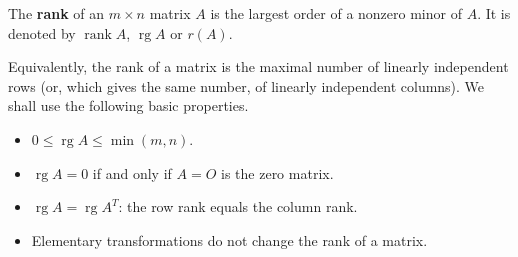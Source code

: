 \begin{tarif}
The \textbf{rank} of an $m\times n$ matrix $A$ is the largest order of a
nonzero minor of $A$. It is denoted by $\operatorname{rank}A$,
$\operatorname{rg}A$ or $r(A)$.
\end{tarif}
Equivalently, the rank of a matrix is the maximal number of linearly
independent rows (or, which gives the same number, of linearly independent
columns). We shall use the following basic properties.
\begin{itemize}[leftmargin=1.3em]
\item $0 \leq \operatorname{rg}A \leq \min(m,n)$.
\item $\operatorname{rg}A = 0$ if and only if $A = O$ is the zero matrix.
\item $\operatorname{rg}A = \operatorname{rg}A^{T}$: the row rank equals the column rank.
\item Elementary transformations do not change the rank of a matrix.
\end{itemize}
